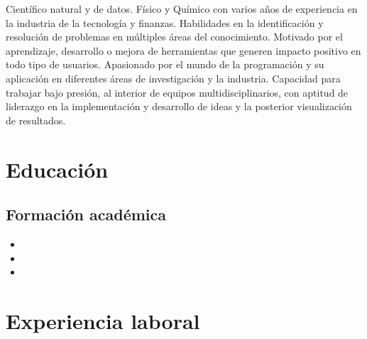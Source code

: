 \documentclass[11pt, letterpaper, sans]{moderncv}        %
\begin{document}
\maketitle

\small{
Científico natural y de datos. Físico y Químico con varios años de experiencia en la industria de la tecnología y finanzas. Habilidades en la identificación y resolución de problemas en múltiples áreas del conocimiento. Motivado por el aprendizaje, desarrollo o mejora de herramientas que generen impacto positivo en todo tipo de usuarios. Apasionado por el mundo de la programación y su aplicaci\'on en diferentes \'areas de investigaci\'on y la industria. Capacidad para trabajar bajo presión, al interior de equipos multidisciplinarios, con aptitud de liderazgo en la implementaci\'on y desarrollo de ideas y la posterior visualizaci\'on de resultados.
}

\section{Educación}

\vspace{5pt}

\subsection{Formación académica}

\vspace{5pt}

\begin{itemize}
	\item{}
	\item{}
	\item{}
\end{itemize}

\vspace{2pt}

\section{Experiencia laboral}
\end{document}
